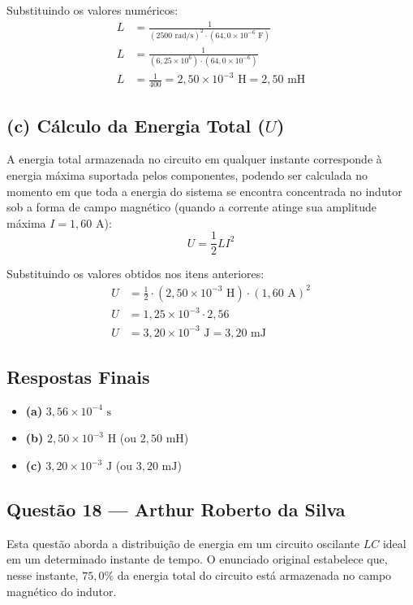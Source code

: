\documentclass[12pt,a4paper]{article}
\begin{document}
Substituindo os valores numéricos:
\begin{align*}
L &= \frac{1}{(2500\text{ rad/s})^2 \cdot (64,0 \times 10^{-6}\text{ F})} \\
L &= \frac{1}{(6,25 \times 10^6) \cdot (64,0 \times 10^{-6})} \\
L &= \frac{1}{400} = 2,50 \times 10^{-3}\text{ H} = 2,50\text{ mH}
\end{align*}

\subsection*{(c) Cálculo da Energia Total ($U$)}

A energia total armazenada no circuito em qualquer instante corresponde à energia máxima suportada pelos componentes, podendo ser calculada no momento em que toda a energia do sistema se encontra concentrada no indutor sob a forma de campo magnético (quando a corrente atinge sua amplitude máxima $I = 1,60\text{ A}$):
\begin{equation*}
U = \frac{1}{2} L I^2
\end{equation*}

Substituindo os valores obtidos nos itens anteriores:
\begin{align*}
U &= \frac{1}{2} \cdot (2,50 \times 10^{-3}\text{ H}) \cdot (1,60\text{ A})^2 \\
U &= 1,25 \times 10^{-3} \cdot 2,56 \\
U &= 3,20 \times 10^{-3}\text{ J} = 3,20\text{ mJ}
\end{align*}

\subsection*{Respostas Finais}
\begin{itemize}
    \item \textbf{(a)} $3,56 \times 10^{-4}\text{ s}$
    \item \textbf{(b)} $2,50 \times 10^{-3}\text{ H}$ \quad (ou $2,50\text{ mH}$)
    \item \textbf{(c)} $3,20 \times 10^{-3}\text{ J}$ \quad (ou $3,20\text{ mJ}$)
\end{itemize}

\subsection{Questão 18 — Arthur Roberto da Silva}
Esta questão aborda a distribuição de energia em um circuito oscilante $LC$ ideal em um determinado instante de tempo. O enunciado original estabelece que, nesse instante, $75,0\%$ da energia total do circuito está armazenada no campo magnético do indutor.
\end{document}
